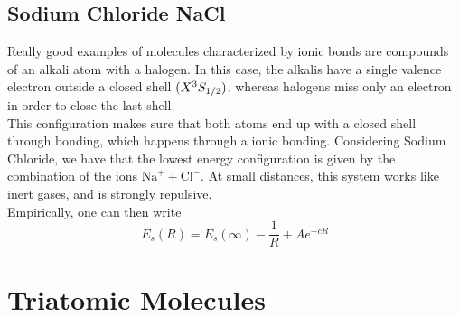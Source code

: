 \documentclass[../qm.tex]{subfiles}
\begin{document}
	\subsection{Sodium Chloride NaCl}
	Really good examples of molecules characterized by ionic bonds are compounds of an alkali atom with a halogen. In this case, the alkalis have a single valence electron outside a closed shell $(X\term[1/2]{S}{3})$, whereas halogens miss only an electron in order to close the last shell.\\
	This configuration makes sure that both atoms end up with a closed shell through bonding, which happens through a ionic bonding. Considering Sodium Chloride, we have that the lowest energy configuration is given by the combination of the ions $\mathrm{Na}^++\mathrm{Cl}^-$. At small distances, this system works like inert gases, and is strongly repulsive.\\
	Empirically, one can then write
	\begin{equation}
		E_s(R)=E_s(\infty)-\frac{1}{R}+Ae^{-cR}
		\label{eq:naclrepulsion}
	\end{equation}
	\section{Triatomic Molecules}
\end{document}
